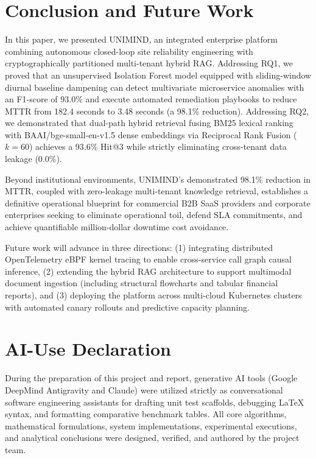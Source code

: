 \documentclass[12pt,onecolumn,draftclsnofoot]{IEEEtran}
\begin{document}
\section{Conclusion and Future Work}

In this paper, we presented UNIMIND, an integrated enterprise platform combining autonomous closed-loop site reliability engineering with cryptographically partitioned multi-tenant hybrid RAG. Addressing RQ1, we proved that an unsupervised Isolation Forest model equipped with sliding-window diurnal baseline dampening can detect multivariate microservice anomalies with an F1-score of 93.0\% and execute automated remediation playbooks to reduce MTTR from 182.4 seconds to 3.48 seconds (a 98.1\% reduction). Addressing RQ2, we demonstrated that dual-path hybrid retrieval fusing BM25 lexical ranking with BAAI/bge-small-en-v1.5 dense embeddings via Reciprocal Rank Fusion ($k=60$) achieves a 93.6\% Hit@3 while strictly eliminating cross-tenant data leakage ($0.0\%$).

Beyond institutional environments, UNIMIND's demonstrated 98.1\% reduction in MTTR, coupled with zero-leakage multi-tenant knowledge retrieval, establishes a definitive operational blueprint for commercial B2B SaaS providers and corporate enterprises seeking to eliminate operational toil, defend SLA commitments, and achieve quantifiable million-dollar downtime cost avoidance.

Future work will advance in three directions: (1) integrating distributed OpenTelemetry eBPF kernel tracing to enable cross-service call graph causal inference, (2) extending the hybrid RAG architecture to support multimodal document ingestion (including structural flowcharts and tabular financial reports), and (3) deploying the platform across multi-cloud Kubernetes clusters with automated canary rollouts and predictive capacity planning.

\section*{AI-Use Declaration}
During the preparation of this project and report, generative AI tools (Google DeepMind Antigravity and Claude) were utilized strictly as conversational software engineering assistants for drafting unit test scaffolds, debugging LaTeX syntax, and formatting comparative benchmark tables. All core algorithms, mathematical formulations, system implementations, experimental executions, and analytical conclusions were designed, verified, and authored by the project team.
\end{document}
